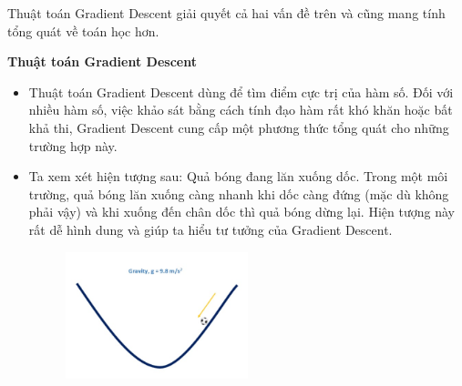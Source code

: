 Thuật toán Gradient Descent giải quyết cả hai vấn đề trên và cũng mang tính tổng quát về toán học hơn.

{\large\textbf{Thuật toán Gradient Descent}}
\begin{itemize}
    \item Thuật toán Gradient Descent dùng để tìm điểm cực trị của hàm số. Đối với nhiều hàm số, việc khảo sát bằng cách tính đạo hàm rất khó khăn hoặc bất khả thi, Gradient Descent cung cấp một phương thức tổng quát cho những trường hợp này. 
    \item Ta xem xét hiện tượng sau: Quả bóng đang lăn xuống dốc. Trong một môi trường, quả bóng lăn xuống càng nhanh khi dốc càng đứng (mặc dù không phải vậy) và khi xuống đến chân dốc thì quả bóng dừng lại. Hiện tượng này rất dễ hình dung và giúp ta hiểu tư tưởng của Gradient Descent.
    \begin{figure}[H]
        \centering
        \includegraphics[width=0.5\textwidth]{image/bt5/lt_vd.jpg}
    \end{figure}


\end{itemize}
